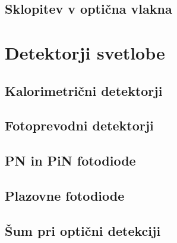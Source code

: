 \documentclass[11pt,fleqn]{book} %
\begin{document}
\section{Sklopitev v optična vlakna}


\chapter{Detektorji svetlobe}

\section{Kalorimetrični detektorji}

\section{Fotoprevodni detektorji}

\section{PN in PiN fotodiode}

\section{Plazovne fotodiode}

\section{Šum pri optični detekciji}


\printindex
\end{document}
